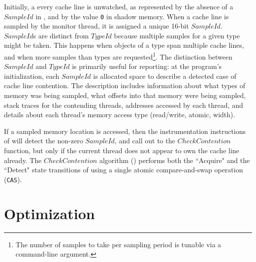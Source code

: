 \documentclass[letterpaper,twocolumn,10pt]{article}
\begin{document}
Initially, a every cache line is unwatched, as represented by the absence of a $SampleId$ in , and by the value
\texttt{0} in shadow memory. When a cache line is sampled by the monitor thread, it is assigned a unique 16-bit $SampleId$. $SampleId$s
are distinct from $TypeId$ because multiple samples for a given type might be taken. This happens when objects of a type span multiple
cache lines, and when more samples than types are requested\footnote{The number of samples to take per sampling period is tunable %
via a command-line argument.}. The distinction between $SampleId$ and $TypeId$ is primarily useful for reporting: at the program's
initialization, each $SampleId$ is allocated space to describe a detected case of cache line contention. The description includes information
about what types of memory was being sampled, what offsets into that memory were being sampled, stack traces for the contending
threads, addresses accessed by each thread, and details about each thread's memory access type (read/write, atomic, width).

If a sampled memory location is accessed, then the instrumentation instructions of  will detect the non-zero
$SampleId$, and call out to the $CheckContention$ function, but only if the current thread does not appear to own the cache line
already. The $CheckContention$ algorithm () performs both the ``Acquire" and the ``Detect" state transitions of
 using a single atomic compare-and-swap operation (\texttt{CAS}).


\section{Optimization}\label{sec:optimizations}


\end{document}
